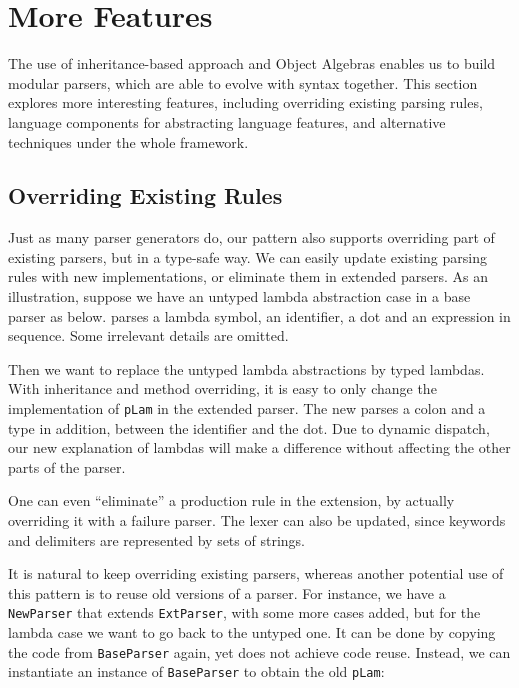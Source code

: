 \section{More Features}

The use of inheritance-based approach and Object Algebras enables us to build modular parsers, which are able to evolve with syntax together. This section explores more interesting features, including overriding existing parsing rules, language components for abstracting language features, and alternative techniques under the whole framework.

\subsection{Overriding Existing Rules}

Just as many parser generators do, our pattern also supports overriding part of existing parsers, but in a type-safe way.
We can easily update existing parsing rules with new implementations, or eliminate them in extended parsers. As an illustration, suppose we have an untyped lambda abstraction case in a base parser as below.  parses a lambda symbol, an identifier, a dot and an expression in sequence. Some irrelevant details are omitted.


Then we want to replace the untyped lambda abstractions by typed lambdas. With inheritance and method overriding, it is easy to only change the implementation of \lstinline{pLam} in the extended parser. The new  parses a colon and a type in addition, between the identifier and the dot. Due to dynamic dispatch, our new explanation of lambdas will make a difference without affecting the other parts of the parser.



One can even ``eliminate'' a production rule in the extension, by actually overriding it with a failure parser. The lexer can also be updated, since keywords and delimiters are represented by sets of strings.

It is natural to keep overriding existing parsers, whereas another potential use of this pattern is to reuse old versions of a parser. For instance,
we have a \lstinline{NewParser} that extends \lstinline{ExtParser}, with some more cases added, but for the lambda case we want to go back to the untyped one.
It can be done by copying the code from \lstinline{BaseParser} again, yet does not achieve code reuse. Instead, we can instantiate an instance of \lstinline{BaseParser} to obtain the old \lstinline{pLam}:

